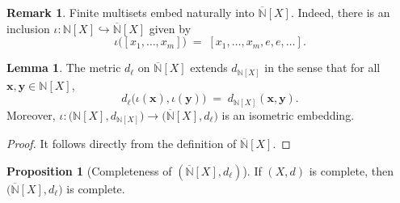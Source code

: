 \documentclass[10pt,a4paper]{article}
\theoremstyle{definition}
\newtheorem{proposition}[theorem]{Proposition}
\newtheorem{remark}[theorem]{Remark}
\newtheorem{lemma}[theorem]{Lemma}
\newcommand{\N}{\mathbb{N}}
\begin{document}
\begin{remark}
Finite multisets embed naturally into $\overline{\N}[X]$.
Indeed, there is an inclusion $\iota:\N[X]\hookrightarrow \overline{\N}[X]$ given by
\[
\iota\bigl([x_1,\dots,x_m]\bigr) \;=\; [x_1,\dots,x_m,e,e,\dots].
\]
\end{remark}

\begin{lemma}\label{lem:d1_metric}
The metric $d_\ell$ on $\overline{\N}[X]$ extends $d_{\N[X]}$ in the sense that for all
$\mathbf{x},\mathbf{y}\in \N[X]$,
\[
d_\ell\bigl(\iota(\mathbf{x}),\iota(\mathbf{y})\bigr) \;=\; d_{\N[X]}(\mathbf{x},\mathbf{y}).
\]
Moreover, $\iota:\bigl(\N[X],d_{\N[X]}\bigr)\to\bigl(\overline{\N}[X],d_\ell\bigr)$
is an isometric embedding.
\end{lemma}
\begin{proof}
    It follows directly from the definition of $\overline{\N}[X]$.
\end{proof}

\begin{proposition}[Completeness of {$(\overline{\N}[X],d_\ell)$}]\label{prop:barSP_complete}
    If $(X,d)$ is complete, then $\bigl(\overline{\N}[X],d_\ell\bigr)$ is complete.
\end{proposition}
\end{document}
